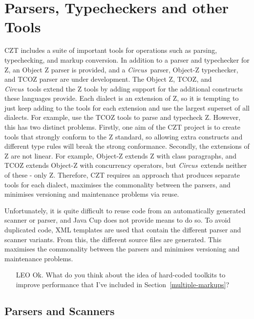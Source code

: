 \documentclass{llncs}
\newcommand{\Circus}{{\sf\slshape Circus}}
\begin{document}
\section{Parsers, Typecheckers and other Tools}

  CZT includes a suite of important tools for operations such as parsing,
  typechecking, and markup conversion. In addition to a parser and
  typechecker for Z, an Object Z parser is provided, and a \Circus\
  parser, Object-Z typechecker, and TCOZ parser are under development.
  The Object Z, TCOZ, and \Circus\ tools extend the Z tools by adding
  support for the additional constructs these languages provide.  Each
  dialect is an extension of Z, so it is tempting to just keep adding
  to the tools for each extension and use the largest superset of all
  dialects. For example, use the TCOZ tools to parse and typecheck
  Z. However, this has two distinct problems. Firstly, one aim of the
  CZT project is to create tools that strongly conform to the Z
  standard, so allowing extra constructs and different type rules will
  break the strong conformance. Secondly, the extensions of Z are not
  linear. For example, Object-Z extends Z with class paragraphs, and
  TCOZ extends Object-Z with concurrency operators, but \Circus\ extends
  neither of these - only Z. Therefore, CZT requires an approach that
  produces separate tools for each dialect, maximises the commonality
  between the parsers, and minimises versioning and maintenance
  problems via reuse.

  Unfortunately, it is quite difficult to reuse code from an
  automatically generated scanner or parser, and Java Cup does not
  provide means to do so.  To avoid duplicated code, XML templates are
  used that contain the different parser and scanner variants.  From
  this, the different source files are generated.  This maximises the
  commonality between the parsers and minimises versioning and
  maintenance problems.

  \begin{itemize}
    \item[LEO] Ok. What do you think about the idea of hard-coded toolkits to
               improve performance that I've included in Section~\ref{multiple-markups}?
  \end{itemize}


\subsection{Parsers and Scanners}
\end{document}
